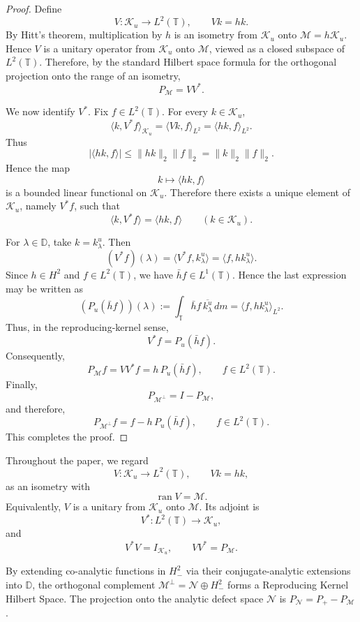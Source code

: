 \documentclass[10pt,a4paper]{amsart}
\def \D{\mathbb{D}}
\def \T{\mathbb{T}}
\newcommand{\clm}{\mathcal{M}}
\newcommand{\cln}{\mathcal{N}}
\newcommand{\clk}{\mathcal{K}}
\numberwithin{equation}{section}
\begin{document}
\begin{proof}
Define
\[
V:\clk_u\to L^2(\T),\qquad Vk=hk .
\]
By Hitt's theorem, multiplication by $h$ is an isometry from $\clk_u$ onto $\clm=h\clk_u$. Hence $V$ is a unitary operator from $\clk_u$ onto $\clm$, viewed as a closed subspace of $L^2(\T)$. Therefore, by the standard Hilbert space formula for the orthogonal projection onto the range of an isometry,
\[
P_\clm=VV^*.
\]

We now identify $V^*$. Fix $f\in L^2(\T)$. For every $k\in\clk_u$,
\[
\langle k,V^*f\rangle_{\clk_u}
=
\langle Vk,f\rangle_{L^2}
=
\langle hk,f\rangle_{L^2}.
\]
Thus
\[
\left|\langle hk,f\rangle\right| \leq \|hk\|_2\|f\|_2 = \|k\|_2\|f\|_2.
\]
Hence the map
\[
k\mapsto \langle hk,f\rangle
\]
is a bounded linear functional on $\clk_u$. Therefore there exists a unique element of $\clk_u$, namely $V^*f$, such that
\[
\langle k,V^*f\rangle
=
\langle hk,f\rangle
\qquad (k\in\clk_u).
\]

For $\lambda\in\D$, take $k=k_\lambda^u$. Then
\[
(V^*f)(\lambda)
= \langle V^*f,k_\lambda^u\rangle = \langle f,hk_\lambda^u\rangle.
\]
Since $h\in H^2$ and $f\in L^2(\T)$, we have $\bar h f\in L^1(\T)$. Hence the last expression may be written as
\[
\left(P_u(\bar h f)\right)(\lambda)
:= \int_\T \bar h f\,\overline{k_\lambda^u}\,dm = \langle f,hk_\lambda^u\rangle_{L^2}.
\]
Thus, in the reproducing-kernel sense,
\[
V^*f=P_u(\bar h f).
\]
Consequently,
\[
P_\clm f = VV^*f = h\,P_u(\bar h f),
\qquad f\in L^2(\T).
\]
Finally,
\[
P_{\clm^\perp}=I-P_\clm,
\]
and therefore,
\[
P_{\clm^\perp}f
=
f-h\,P_u(\bar h f),
\qquad f\in L^2(\T).
\]
This completes the proof.
\end{proof}

Throughout the paper, we regard
\[
V:\clk_u\to L^2(\T),\qquad Vk=hk,
\]
as an isometry with
\[
\operatorname{ran}V=\clm.
\]
Equivalently, $V$ is a unitary from $\clk_u$ onto $\clm$. Its adjoint is
\[
V^*:L^2(\T)\to\clk_u,
\]
and
\[
V^*V=I_{\clk_u}, \qquad VV^*=P_\clm.
\]



By extending co-analytic functions in $H_{-}^2$ via their conjugate-analytic extensions into $\D$, the orthogonal complement $\clm^\perp = \cln \oplus H_{-}^2$ forms a Reproducing Kernel Hilbert Space. The projection onto the analytic defect space $\cln$ is $P_\cln = P_{+} - P_\clm$.
\end{document}
